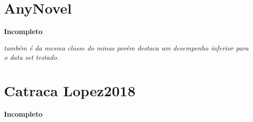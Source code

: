 


\section{AnyNovel}
\textbf{Incompleto}

\textit{também é da mesma classe do minas porém  destaca um
desempenho inferior para o \emph{data set} testado.}


\section{Catraca Lopez2018}
\textbf{Incompleto}

\cite{Lopez2018}


